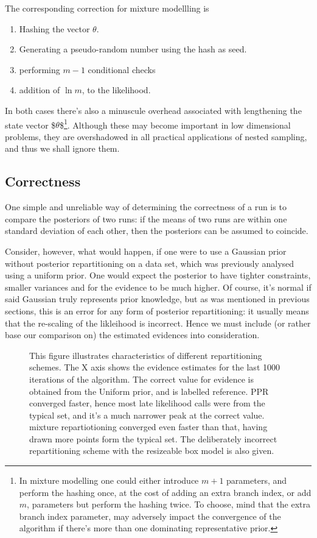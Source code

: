 \documentclass[usenatbib]{mnras}
\begin{document}
The corresponding correction for mixture modellling is
\begin{enumerate}
\item Hashing the vector \(\theta\).
\item Generating a pseudo-random number using the hash as seed.
\item performing \(m-1\) conditional checks
\item addition of \(\ln m\), to the likelihood.
\end{enumerate}

In both cases there's also a minuscule overhead associated with
lengthening the state vector \$\(\theta\)\$\footnote{In mixture modelling one could either introduce $m+1$ parameters, and perform the hashing once, at the cost of adding an extra branch index, or add $m$, parameters but perform the hashing twice. To choose, mind that the extra branch index parameter, may adversely impact the convergence of the algorithm if there's more than one dominating representative prior. }.
Although these may become important in low dimensional problems,
they are overshadowed in all practical applications of nested
sampling, and thus we shall ignore them.

\subsection{Correctness}
\label{sec:orgd8d8ea5}
One simple and unreliable way of determining the correctness of a
run is to compare the posteriors of two runs: if the means of two
runs are within one standard deviation of each other, then the
posteriors can be assumed to coincide.

Consider, however, what would happen, if one were to use a Gaussian
prior without posterior repartitioning on a data set, which was
previously analysed using a uniform prior. One would expect the
posterior to have tighter constraints, smaller variances and for
the evidence to be much higher. Of course, it's normal if said
Gaussian truly represents prior knowledge, but as was mentioned in
previous sections, this is an error for any form of posterior
repartitioning: it usually means that the re-scaling of the
likleihood is incorrect. Hence we must include (or rather base our
comparison on) the estimated evidences into consideration.

\begin{figure}

\caption{\label{org80abd74}
This figure illustrates characteristics of different repartitioning schemes. The X axis shows the evidence estimates for the last 1000 iterations of the algorithm. The correct value for evidence is obtained from the Uniform prior, and is labelled reference. PPR converged faster, hence most late likelihood calls were from the typical set, and it's a much narrower peak at the correct value. mixture repartiotioning converged even faster than that, having drawn more points form the typical set. The deliberately incorrect repartitioning scheme with the resizeable box model is also given.}
\end{figure}
\end{document}
